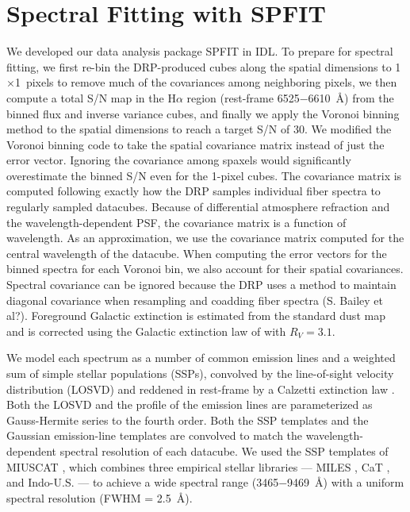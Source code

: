 \documentclass[iop,revtex4,twocolumn,apj,numberedappendix,appendixfloats]{emulateapj}
\begin{document}
\section{Spectral Fitting with SPFIT}

We developed our data analysis package {\sc SPFIT} in IDL. To prepare for spectral fitting, we first re-bin the DRP-produced cubes along the spatial dimensions to 1\arcsec$\times$1\arcsec\ pixels to remove much of the covariances among neighboring pixels, we then compute a total S/N map in the H$\alpha$ region (rest-frame 6525$-$6610~\AA) from the binned flux and inverse variance cubes, and finally we apply the Voronoi binning method \citep{Cappellari03} to the spatial dimensions to reach a target S/N of 30. We modified the Voronoi binning code to take the spatial covariance matrix instead of just the error vector. Ignoring the covariance among spaxels would significantly overestimate the binned S/N even for the 1\arcsec-pixel cubes. The covariance matrix is computed following exactly how the DRP samples individual fiber spectra to regularly sampled datacubes. Because of differential atmosphere refraction and the wavelength-dependent PSF, the covariance matrix is a function of wavelength. As an approximation, we use the covariance matrix computed for the central wavelength of the datacube. When computing the error vectors for the binned spectra for each Voronoi bin, we also account for their spatial covariances. Spectral covariance can be ignored because the DRP uses a method to maintain diagonal covariance when resampling and coadding fiber spectra (S. Bailey et al?). Foreground Galactic extinction is estimated from the standard dust map \citep{Schlegel98} and is corrected using the Galactic extinction law of \citet{Cardelli89} with $R_V = 3.1$. 

We model each spectrum as a number of common emission lines and a weighted sum of simple stellar populations (SSPs), convolved by the line-of-sight velocity distribution (LOSVD) and reddened in rest-frame by a Calzetti extinction law \citet{Calzetti00}. Both the LOSVD and the profile of the emission lines are parameterized as Gauss-Hermite series \citep{van-der-Marel93} to the fourth order. Both the SSP templates and the Gaussian emission-line templates are convolved to match the wavelength-dependent spectral resolution of each datacube. We used the SSP templates of MIUSCAT \citep{Vazdekis12}, which combines three empirical stellar libraries --- MILES \citep{Sanchez-Blazquez06}, CaT \citep{Cenarro01}, and Indo-U.S. \citep{Valdes04} --- to achieve a wide spectral range (3465$-$9469~\AA) with a uniform spectral resolution (FWHM = 2.5~\AA).  
\end{document}
